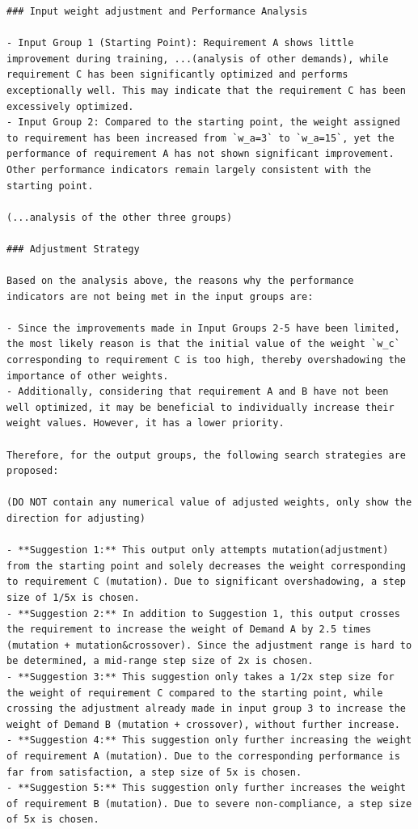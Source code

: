 \documentclass{article}
\begin{document}
\begin{verbatim}
### Input weight adjustment and Performance Analysis

- Input Group 1 (Starting Point): Requirement A shows little improvement during training, ...(analysis of other demands), while requirement C has been significantly optimized and performs exceptionally well. This may indicate that the requirement C has been excessively optimized.
- Input Group 2: Compared to the starting point, the weight assigned to requirement has been increased from `w_a=3` to `w_a=15`, yet the performance of requirement A has not shown significant improvement. Other performance indicators remain largely consistent with the starting point.

(...analysis of the other three groups)

### Adjustment Strategy

Based on the analysis above, the reasons why the performance indicators are not being met in the input groups are:

- Since the improvements made in Input Groups 2-5 have been limited, the most likely reason is that the initial value of the weight `w_c` corresponding to requirement C is too high, thereby overshadowing the importance of other weights.
- Additionally, considering that requirement A and B have not been well optimized, it may be beneficial to individually increase their weight values. However, it has a lower priority.

Therefore, for the output groups, the following search strategies are proposed:

(DO NOT contain any numerical value of adjusted weights, only show the direction for adjusting)

- **Suggestion 1:** This output only attempts mutation(adjustment) from the starting point and solely decreases the weight corresponding to requirement C (mutation). Due to significant overshadowing, a step size of 1/5x is chosen.
- **Suggestion 2:** In addition to Suggestion 1, this output crosses the requirement to increase the weight of Demand A by 2.5 times (mutation + mutation&crossover). Since the adjustment range is hard to be determined, a mid-range step size of 2x is chosen.
- **Suggestion 3:** This suggestion only takes a 1/2x step size for the weight of requirement C compared to the starting point, while crossing the adjustment already made in input group 3 to increase the weight of Demand B (mutation + crossover), without further increase.
- **Suggestion 4:** This suggestion only further increasing the weight of requirement A (mutation). Due to the corresponding performance is far from satisfaction, a step size of 5x is chosen.
- **Suggestion 5:** This suggestion only further increases the weight of requirement B (mutation). Due to severe non-compliance, a step size of 5x is chosen.


\end{verbatim}
\end{document}
